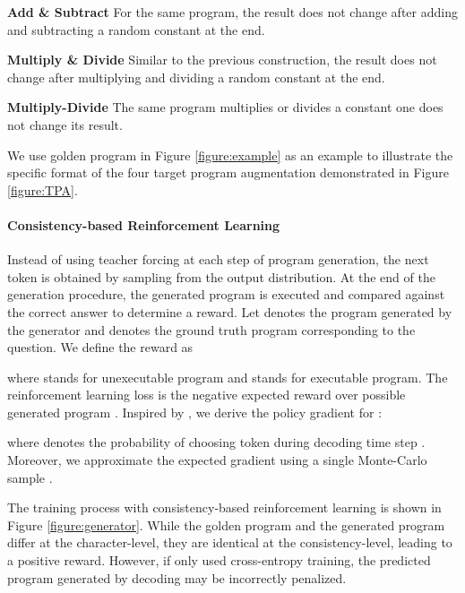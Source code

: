 \documentclass[11pt]{article}
\begin{document}
\textbf{Add \& Subtract} For the same program, the result does not change after adding and subtracting a random constant at the end. 

\textbf{Multiply \& Divide} Similar to the previous construction, the result does not change after multiplying and dividing a random constant at the end. 

\textbf{Multiply-Divide} The same program multiplies or divides a constant one does not change its result.

We use golden program in Figure \ref{figure:example} as an example to illustrate the specific format of the four target program augmentation demonstrated in Figure \ref{figure:TPA}.







\paragraph{Consistency-based Reinforcement Learning}
\label{sec:rl}
Instead of using teacher forcing at each step of program generation, the next token is obtained by sampling from the output distribution. At the end of the generation procedure, the generated program is executed and compared against the correct answer to determine a reward. Let  denotes the program generated by the generator and  denotes the ground truth program corresponding to the question. We define the reward  as

where  stands for unexecutable program and  stands for executable program.
The reinforcement learning loss is the negative expected reward over possible generated program . Inspired by \citet{zhong2017seq2sql}, we derive the policy gradient for :

where  denotes the probability of choosing token  during decoding time step . Moreover, we approximate the expected gradient using a single Monte-Carlo sample .

The training process with consistency-based reinforcement learning is shown in Figure \ref{figure:generator}. While the golden program and the generated program differ at the character-level, they are identical at the consistency-level, leading to a positive reward. However, if only used cross-entropy training, the predicted program generated by decoding may be incorrectly penalized.
\end{document}
